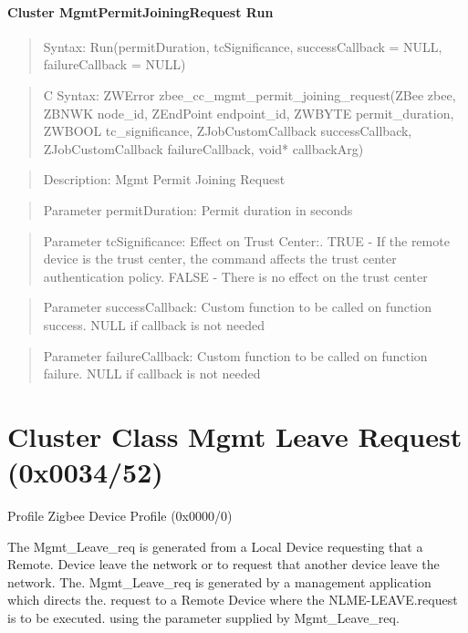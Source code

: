 \paragraph{Cluster MgmtPermitJoiningRequest Run}
\begin{quote}Syntax: Run(permitDuration, tcSignificance, successCallback = NULL, failureCallback = NULL)\end{quote}
\begin{quote}C Syntax: ZWError zbee\_cc\_mgmt\_permit\_joining\_request(ZBee zbee, ZBNWK node\_id, ZEndPoint endpoint\_id, ZWBYTE permit\_duration, ZWBOOL tc\_significance, ZJobCustomCallback successCallback, ZJobCustomCallback failureCallback, void* callbackArg)\end{quote}
\begin{quote}Description: Mgmt Permit Joining Request\end{quote}
\begin{quote}Parameter permitDuration: Permit duration in seconds\end{quote}
\begin{quote}Parameter tcSignificance: Effect on Trust Center:. TRUE  - If the remote device is the trust center, the command affects the trust center authentication policy. FALSE - There is no effect on the trust center\end{quote}
\begin{quote}Parameter successCallback: Custom function to be called on function success. NULL if callback is not needed\end{quote}
\begin{quote}Parameter failureCallback: Custom function to be called on function failure. NULL if callback is not needed\end{quote}



\section{Cluster Class Mgmt Leave Request (0x0034/52)}

Profile Zigbee Device Profile (0x0000/0)

The Mgmt\_Leave\_req is generated from a Local Device requesting that a Remote. Device leave the network or to request that another device leave the network. The. Mgmt\_Leave\_req is generated by a management application which directs the. request to a Remote Device where the NLME-LEAVE.request is to be executed. using the parameter supplied by Mgmt\_Leave\_req.

